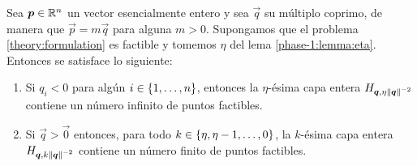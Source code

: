 \begin{theorem}
	\label{theory:th:feasibility}
	Sea $\boldsymbol{p} \in \mathbb{R}^n$ un vector esencialmente entero y sea
	$\vec{q}$ su múltiplo coprimo, de manera que $\vec{p} = m\vec{q}$ para alguna $m > 0$.
	Supongamos que el problema \eqref{theory:formulation} es factible y tomemos $\eta$ del lema
	\ref{phase-1:lemma:eta}. Entonces se satisface lo siguiente: \begin{enumerate}
		\item Si $q_i < 0$ para algún $i \in \lbrace 1, \ldots, n \rbrace$, entonces la $\eta$-ésima
			capa entera $H_{\boldsymbol{q}, \eta\left\lVert \boldsymbol{q} \right\rVert^{-2}}$ contiene un número infinito de puntos factibles.
		\item Si $\vec{q} > \vec{0}$ entonces, para todo $k \in \lbrace \eta, \eta - 1, \ldots, 0 \rbrace$,
			la $k$-ésima capa entera $H_{\boldsymbol{q}, k\left\lVert \boldsymbol{q} \right\rVert^{-2}}$ contiene un número finito de puntos factibles.
	\end{enumerate}
\end{theorem}
